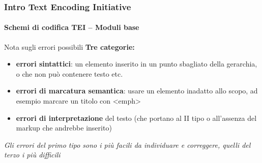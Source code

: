 \begin{frame}
	\frametitle{Intro Text Encoding Initiative}
	\framesubtitle{Schemi di codifica TEI – Moduli base}
	\addtocounter{nframe}{1}

	\begin{block}{Nota sugli errori possibili}
        \textbf{Tre categorie:}
        \begin{itemize}
            \item \textbf{errori sintattici}: un elemento inserito in un punto sbagliato
            della gerarchia, o che non può contenere testo etc.
            \item \textbf{errori di marcatura semantica}: usare un elemento inadatto
            allo scopo, ad esempio marcare un titolo con <emph>
            \item \textbf{errori di interpretazione} del testo (che portano al II tipo o
            all’assenza del markup che andrebbe inserito)
        \end{itemize}
       
    \end{block}
    \textit{Gli errori del primo tipo sono i più facili da individuare e
        correggere, quelli del terzo i più difficili}

\end{frame}







